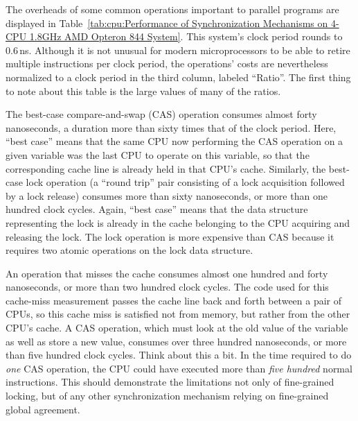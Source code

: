 The overheads of some common operations important to parallel programs are
displayed in
Table~\ref{tab:cpu:Performance of Synchronization Mechanisms on 4-CPU 1.8GHz AMD Opteron 844 System}.
This system's clock period rounds to 0.6\,ns.
Although it is not unusual for modern microprocessors to be able to
retire multiple instructions per clock period, the operations' costs are
nevertheless normalized to a clock period in the third column, labeled
``Ratio''.
The first thing to note about this table is the large values of many of
the ratios.

The best-case compare-and-swap (CAS) operation consumes almost forty
nanoseconds, a duration more than sixty times that of the clock period.
Here, ``best case'' means that the same CPU now performing the CAS operation
on a given variable was the last CPU to operate on this variable, so
that the corresponding cache line is already held in that CPU's cache.
Similarly, the best-case lock operation (a ``round trip'' pair consisting
of a lock acquisition followed by a lock release) consumes more than
sixty nanoseconds, or more than one hundred clock cycles.
Again, ``best case'' means that the data structure representing the
lock is already in the cache belonging to the CPU acquiring and releasing
the lock.
The lock operation is more expensive than CAS because it requires two
atomic operations on the lock data structure.

An operation that misses the cache consumes almost one hundred and forty
nanoseconds, or more than two hundred clock cycles.
The code used for this cache-miss measurement passes the cache line
back and forth between a pair of CPUs, so this cache miss is satisfied
not from memory, but rather from the other CPU's cache.
A CAS operation, which must look at the old value of the variable as
well as store a new value, consumes over three hundred nanoseconds, or
more than five hundred clock cycles.
Think about this a bit.
In the time required to do \emph{one} CAS operation, the CPU could have
executed more than \emph{five hundred} normal instructions.
This should demonstrate the limitations not only of fine-grained locking,
but of any other synchronization mechanism relying on fine-grained
global agreement.

